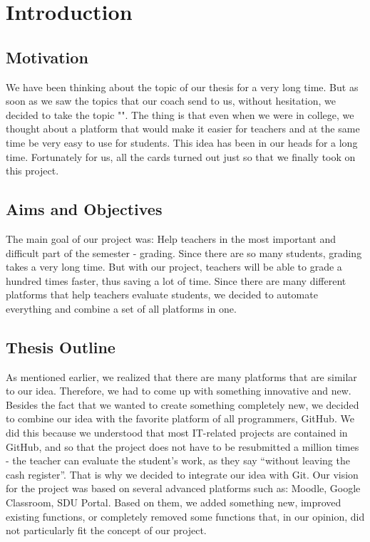 \chapter{Introduction}\label{ch:intro}
\section{Motivation}
We have been thinking about the topic of our thesis for a very long time. But as soon as we saw the topics that our coach send to us, without hesitation, we decided to take the topic "{\mytitle}". The thing is that even when we were in college, we thought about a platform that would make it easier for teachers and at the same time be very easy to use for students. This idea has been in our heads for a long time. Fortunately for us, all the cards turned out just so that we finally took on this project.
\section{Aims and Objectives}
The main goal of our project was: Help teachers in the most important and difficult part of the semester - grading. Since there are so many students, grading takes a very long time. But with our project, teachers will be able to grade a hundred times faster, thus saving a lot of time. Since there are many different platforms that help teachers evaluate students, we decided to automate everything and combine a set of all platforms in one.
\section{Thesis Outline}
As mentioned earlier, we realized that there are many platforms that are similar to our idea. Therefore, we had to come up with something innovative and new. Besides the fact that we wanted to create something completely new, we decided to combine our idea with the favorite platform of all programmers, GitHub. We did this because we understood that most IT-related projects are contained in GitHub, and so that the project does not have to be resubmitted a million times - the teacher can evaluate the student’s work, as they say “without leaving the cash register”. That is why we decided to integrate our idea with Git. Our vision for the project was based on several advanced platforms such as: Moodle, Google Classroom, SDU Portal. Based on them, we added something new, improved existing functions, or completely removed some functions that, in our opinion, did not particularly fit the concept of our project.